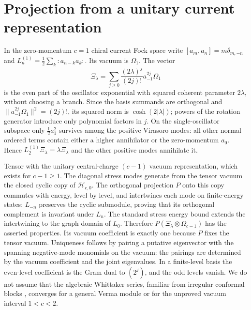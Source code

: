 \documentclass[11pt]{article}
\newcommand{\Om}{\Omega}
\begin{document}
\section{Projection from a unitary current representation}
In the zero-momentum $c=1$ chiral current Fock space write $[a_m,a_n]=m\delta_{m,-n}$ and $L_n^{(1)}=\tfrac12\sum_k:a_{n-k}a_k:$. Its vacuum is $\Om_1$. The vector
\[
\Xi_\lambda=\sum_{j\ge0}\frac{(2\lambda)^j}{(2j)!}a_{-1}^{2j}\Om_1
\]
is the even part of the oscillator exponential with squared coherent parameter $2\lambda$, without choosing a branch. Since the basis summands are orthogonal and $\|a_{-1}^{2j}\Om_1\|^2=(2j)!$, its squared norm is $\cosh(2|\lambda|)$; powers of the rotation generator introduce only polynomial factors in $j$. On the single-oscillator subspace only $\tfrac12a_1^2$ survives among the positive Virasoro modes: all other normal ordered terms contain either a higher annihilator or the zero-momentum $a_0$. Hence $L_2^{(1)}\Xi_\lambda=\lambda\Xi_\lambda$ and the other positive modes annihilate it.

Tensor with the unitary central-charge $(c-1)$ vacuum representation, which exists for $c-1\ge1$. The diagonal stress modes generate from the tensor vacuum the closed cyclic copy of $\mathcal H_{c,0}$. The orthogonal projection $P$ onto this copy commutes with energy, level by level, and intertwines each mode on finite-energy states: $L_{-n}$ preserves the cyclic submodule, proving that its orthogonal complement is invariant under $L_n$. The standard stress energy bound \cite{carpi} extends the intertwining to the graph domain of $L_0$. Therefore $P(\Xi_\lambda\otimes\Om_{c-1})$ has the asserted properties. Its vacuum coefficient is exactly one because $P$ fixes the tensor vacuum. Uniqueness follows by pairing a putative eigenvector with the spanning negative-mode monomials on the vacuum: the pairings are determined by the vacuum coefficient and the joint eigenvalues. In a finite-level basis the even-level coefficient is the Gram dual to $(2^j)$, and the odd levels vanish. We do not assume that the algebraic Whittaker series, familiar from irregular conformal blocks \cite{whittaker,irregular}, converges for a general Verma module or for the unproved vacuum interval $1<c<2$.
\end{document}
